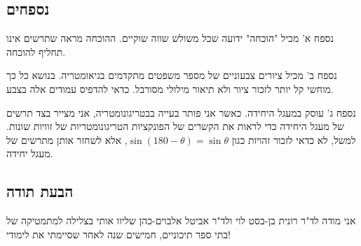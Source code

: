 \vspace{-3ex}


\subsection*{נספחים}

נספח א' מכיל "הוכחה" ידועה שכל משולש שווה שוקיים. ההוכחה מראה שתרשים אינו תחליף להוכחה.

נספח ב' מכיל ציורים צבעוניים של מספר משפטים מתקדמים בגיאומטריה. בנושא כל כך מוחשי קל יותר לזכור ציור ולא תיאור מילולי מסורבל. כדאי להדפיס עמודים אלה בצבע.

נספח ג' עוסק במעגל היחידה. כאשר אני פותר בעייה בבטריגונומטריה, אני מצייר בצד תרשים של מעגל היחידה כדי לראות את הקשרים של הפונקציות  הטריגונומטריות של זוויות שונות.  למשל, לא כדאי לזכור זהויות כגון
$\sin (180\!-\!\theta)=\sin \theta$,
אלא לשחזר אותן מתרשים של מעגל יחידה.

\subsection*{הבעת תודה}

אני מודה לד"ר רונית בן-בסט לוי ולד"ר אביטל אלבוים-כהן שליוו אותי בצלילה למתמטיקה של בתי ספר תיכוניים, חמישים שנה לאחר שסיימתי את לימודי!

\np

